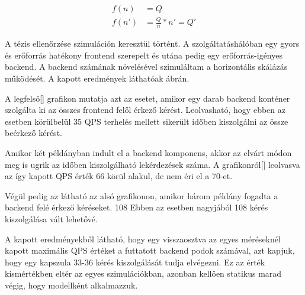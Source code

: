 \begin{align*}
f(n) &= Q \nonumber \\
f(n') &= \frac{Q}{n} * n' = Q' \label{eq:maxQPS}
\end{align*}

A tézis ellenőrzése szimuláción keresztül történt.
A szolgáltatáshálóban egy gyors és erőforrás hatékony frontend szerepelt és utána pedig egy erőforrás-igényes backend. 
A backend számának növelésével szimuláltam a horizontális skálázás működését.
A kapott eredmények láthatóak  ábrán.

A legfelső[] grafikon mutatja azt az esetet, amikor egy darab backend konténer szolgálta ki az összes frontend felől érkező kérést.
Leolvasható, hogy ebben az esetben körülbelül 35 QPS terhelés mellett sikerült időben kiszolgálni az össze beérkező kérést.

Amikor két példányban indult el a backend komponens, akkor az elvárt módon meg is ugrik az időben kiszolgálható lekérdezések száma.
A grafikonról[] leolvasva az így kapott QPS érték 66 körül alakul, de nem éri el a 70-et.

Végül pedig az látható az alsó grafikonon, amikor három példány fogadta a backend felé érkező kéréseket. 108
Ebben az esetben nagyjából 108 kérés kiszolgálása vált lehetővé.

A kapott eredményekből látható, hogy egy visszaosztva az egyes méréseknél kapott maximális QPS értéket a futtatott backend podok számával, azt kapjuk, hogy egy kapszula 33-36 kérés kiszolgálását tudja elvégezni.
Ez az érték kismértékben eltér az egyes szimulációkban, azonban kellően statikus marad végig, hogy modellként alkalmazzuk.


